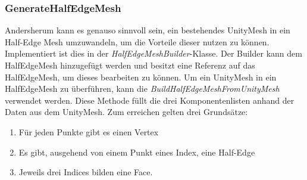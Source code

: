 \subsubsection{GenerateHalfEdgeMesh}
Andersherum kann es genauso sinnvoll sein, ein bestehendes UnityMesh in ein Half-Edge Mesh umzuwandeln, um die Vorteile dieser nutzen zu k\"onnen. Implementiert ist dies in der \textit{HalfEdgeMeshBuilder}-Klasse. Der Builder kann dem HalfEdgeMesh hinzugef\"ugt werden und besitzt eine Referenz auf das HalfEdgeMesh, um dieses bearbeiten zu k\"onnen. Um ein UnityMesh in ein HalfEdgeMesh zu \"uberf\"uhren, kann die \textit{BuildHalfEdgeMeshFromUnityMesh} verwendet werden. Diese Methode f\"ullt die drei Komponentenlisten anhand der Daten aus dem UnityMesh. 
Zum erreichen gelten drei Grunds\"atze:
\begin{enumerate}
	\item F\"ur jeden Punkte gibt es einen Vertex
	\item Es gibt, ausgehend von einem Punkt eines Index, eine Half-Edge
	\item Jeweils drei Indices bilden eine Face.
\end{enumerate}
